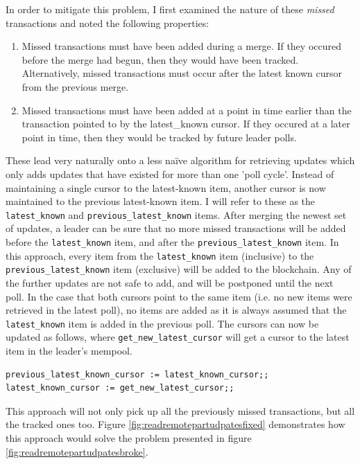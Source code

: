 \documentclass[12pt,a4paper,twoside,openright]{report}
\begin{document}
			In order to mitigate this problem, I first examined the nature of these \textit{missed} transactions and noted the following properties:
			\begin{enumerate}
				\item Missed transactions must have been added during a merge. If they occured before the merge had begun, then they would have been tracked. 
				Alternatively, missed transactions must occur after the latest known cursor from the previous merge. 
				\item Missed transactions must have been added at a point in time earlier than the transaction pointed to by the latest\_known cursor. 
				If they occured at a later point in time, then they would be tracked by future leader polls.
			\end{enumerate}
			These lead very naturally onto a less na{\"i}ve algorithm for retrieving updates which only adds updates that have existed for more than one 'poll cycle'.
			Instead of maintaining a single cursor to the latest-known item, another cursor is now maintained to the previous latest-known item. 
			I will refer to these as the \texttt{latest\_known} and \texttt{previous\_latest\_known} items.
			After merging the newest set of updates, a leader can be sure that no more missed transactions will be added before the \texttt{latest\_known} item, and after the \texttt{previous\_latest\_known} item. 
			In this approach, every item from the \texttt{latest\_known} item (inclusive) to the \texttt{previous\_latest\_known} item (exclusive) will be added to the blockchain. 
			Any of the further updates are not safe to add, and will be postponed until the next poll.
			In the case that both cursors point to the same item (i.e. no new items were retrieved in the latest poll), no items are added as it is always assumed that the \texttt{latest\_known} item is added in the previous poll.
			The cursors can now be updated as follows, where \texttt{get\_new\_latest\_cursor} will get a cursor to the latest item in the leader's mempool.
			\begin{lstlisting}
previous_latest_known_cursor := latest_known_cursor;;
latest_known_cursor := get_new_latest_cursor;;
			\end{lstlisting}
			This approach will not only pick up all the previously missed transactions, but all the tracked ones too.
			Figure \ref{fig:readremotepartudpatesfixed} demonstrates how this approach would solve the problem presented in figure \ref{fig:readremotepartudpatesbroke}.
\end{document}
